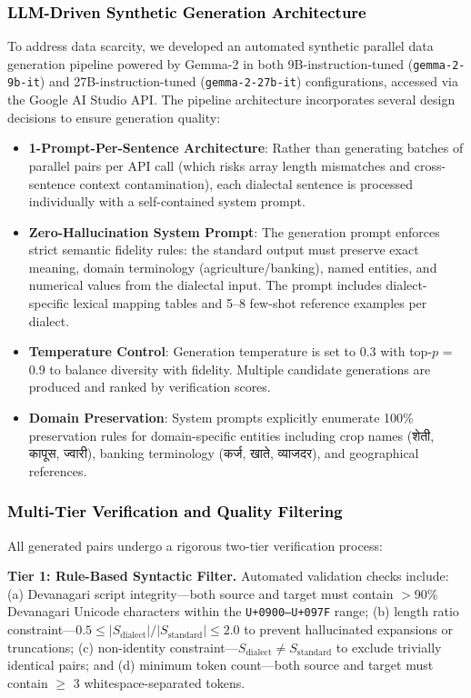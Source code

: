 \subsubsection{\textcolor{black}{LLM-Driven Synthetic Generation Architecture}}

To address data scarcity, we developed an automated synthetic parallel data generation pipeline powered by Gemma-2 \cite{gemma2024} in both 9B-instruction-tuned (\texttt{gemma-2-9b-it}) and 27B-instruction-tuned (\texttt{gemma-2-27b-it}) configurations, accessed via the Google AI Studio API. The pipeline architecture incorporates several design decisions to ensure generation quality:

\begin{itemize}
    \item \textbf{1-Prompt-Per-Sentence Architecture}: Rather than generating batches of parallel pairs per API call (which risks array length mismatches and cross-sentence context contamination), each dialectal sentence is processed individually with a self-contained system prompt.
    \item \textbf{Zero-Hallucination System Prompt}: The generation prompt enforces strict semantic fidelity rules: the standard output must preserve exact meaning, domain terminology (agriculture/banking), named entities, and numerical values from the dialectal input. The prompt includes dialect-specific lexical mapping tables and 5--8 few-shot reference examples per dialect.
    \item \textbf{Temperature Control}: Generation temperature is set to 0.3 with top-$p$ = 0.9 to balance diversity with fidelity. Multiple candidate generations are produced and ranked by verification scores.
    \item \textbf{Domain Preservation}: System prompts explicitly enumerate 100\% preservation rules for domain-specific entities including crop names (शेती, कापूस, ज्वारी), banking terminology (कर्ज, खाते, व्याजदर), and geographical references.
\end{itemize}

\subsubsection{\textcolor{black}{Multi-Tier Verification and Quality Filtering}}

All generated pairs undergo a rigorous two-tier verification process:

\textbf{Tier 1: Rule-Based Syntactic Filter.} Automated validation checks include: (a) Devanagari script integrity---both source and target must contain $>$90\% Devanagari Unicode characters within the \texttt{U+0900--U+097F} range; (b) length ratio constraint---$0.5 \le |S_{\text{dialect}}| / |S_{\text{standard}}| \le 2.0$ to prevent hallucinated expansions or truncations; (c) non-identity constraint---$S_{\text{dialect}} \neq S_{\text{standard}}$ to exclude trivially identical pairs; and (d) minimum token count---both source and target must contain $\ge$ 3 whitespace-separated tokens.

